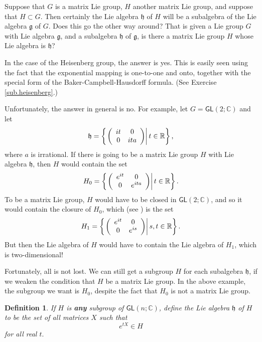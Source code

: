 \documentclass{amsbook}
\let \frak = \mathfrak
\theoremstyle{plain}
\newtheorem{definition}[theorem]{Definition}
\numberwithin{equation}{chapter}
\numberwithin{theorem}{chapter}
\begin{document}
Suppose that $G$ is a matrix Lie group, $H$ another matrix Lie group, and
suppose that $H\subset G$. Then certainly the Lie algebra $\frak{h}$ of $H$
will be a subalgebra of the Lie algebra $\frak{g}$ of $G$. Does this go the
other way around? That is given a Lie group $G$ with Lie algebra $\frak{g}$,
and a subalgebra $\frak{h}$ of $\frak{g}$, is there a matrix Lie group $H$
whose Lie algebra is $\frak{h}$?

In the case of the Heisenberg group, the answer is yes. This is easily seen
using the fact that the exponential mapping is one-to-one and onto, together
with the special form of the Baker-Campbell-Hausdorff formula. (See Exercise
\ref{sub.heisenberg}.)

Unfortunately, the answer in general is no. For example, let $G=\mathsf{GL}%
\left(  2;\mathbb{C}\right)  $ and let
\[
\frak{h}=\left\{  \left.  \left(
\begin{array}
[c]{cc}%
it & 0\\
0 & ita
\end{array}
\right)  \right|  t\in\mathbb{R}\right\}  \text{,}%
\]
where $a$ is irrational. If there is going to be a matrix Lie group $H$ with
Lie algebra $\frak{h}$, then $H$ would contain the set
\[
H_{0}=\left\{  \left.  \left(
\begin{array}
[c]{cc}%
e^{it} & 0\\
0 & e^{ita}%
\end{array}
\right)  \right|  t\in\mathbb{R}\right\}  \text{.}%
\]
To be a matrix Lie group, $H$ would have to be closed in $\mathsf{GL}\left(
2;\mathbb{C}\right)  $, and so it would contain the closure of $H_{0}$, which
(see ) is the set
\[
H_{1}=\left\{  \left.  \left(
\begin{array}
[c]{cc}%
e^{it} & 0\\
0 & e^{is}%
\end{array}
\right)  \right|  s,t\in\mathbb{R}\right\}  \text{.}%
\]
But then the Lie algebra of $H$ would have to contain the Lie algebra of
$H_{1}$, which is two-dimensional!

Fortunately, all is not lost. We can still get a subgroup $H$ for each
subalgebra $\frak{h}$, if we weaken the condition that $H$ be a matrix Lie
group. In the above example, the subgroup we want is $H_{0}$, despite the fact
that $H_{0}$ is not a matrix Lie group.

\begin{definition}
If $H$ is \textbf{any} subgroup of $\mathsf{GL}\left(  n;\mathbb{C}\right)  $,
define the Lie algebra $\frak{h}$ of $H$ to be the set of all matrices $X$
such that
\[
e^{tX}\in H
\]
for all real $t.$
\end{definition}
\end{document}
